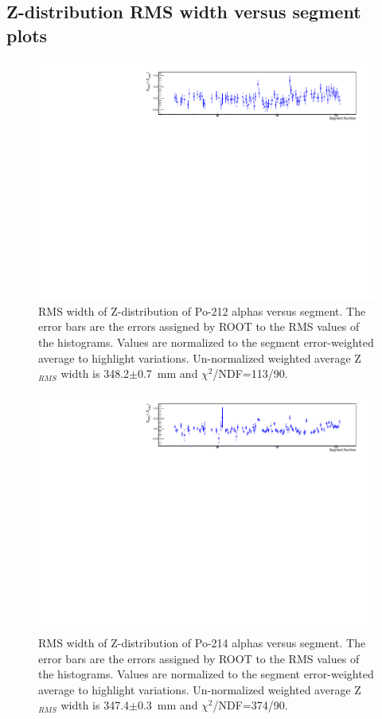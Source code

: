 \subsection{Z-distribution RMS width versus segment plots}
\begin{figure}[!h]
\centering
\includegraphics[width=1.05\textwidth]{figures/PubBiPo212ZRMSvsCell.pdf}
\caption{\label{fig:ZRMSvsCell212}RMS width of Z-distribution of Po-212 alphas versus segment. The error bars are the errors assigned by ROOT to the RMS values of the histograms. Values are normalized to the segment error-weighted average to highlight variations. Un-normalized weighted average Z$_{RMS}$ width is 348.2$\pm$0.7~mm and $\chi^2$/NDF=113/90. }
\end{figure}
\begin{figure}[!h]
\centering
\includegraphics[width=1.05\textwidth]{figures/PubBiPo214ZRMSvsCell.pdf}
\caption{\label{fig:ZRMSvsCell214}RMS width of Z-distribution of Po-214 alphas versus segment. The error bars are the errors assigned by ROOT to the RMS values of the histograms. Values are normalized to the segment error-weighted average to highlight variations. Un-normalized weighted average Z$_{RMS}$ width is 347.4$\pm$0.3~mm and $\chi^2$/NDF=374/90.}
\end{figure}
\clearpage
\newpage
